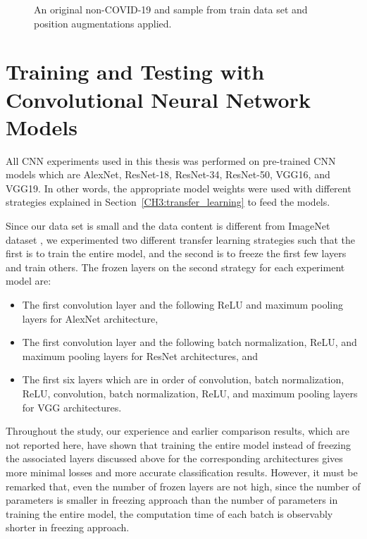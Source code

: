 \begin{figure}[h]
	\caption{An original non-COVID-19 and sample from train data set and position augmentations applied.}
	\label{augmented_sample}
\end{figure}

\section{Training and Testing with Convolutional Neural Network Models}\label{sec:CH5_cnn_experiments}

All CNN experiments used in this thesis was performed on pre-trained CNN models which are AlexNet, ResNet-18, ResNet-34, ResNet-50, VGG16, and VGG19. In other words, the appropriate model weights were used with different strategies explained in Section~\ref{CH3:transfer_learning} to feed the models.

Since our data set is small and the data content is different from ImageNet dataset \cite{imagenet}, we experimented two different transfer learning strategies such that the first is to train the entire model, and the second is to freeze the first few layers and train others. The frozen layers on the second strategy for each experiment model are:

\begin{itemize}
    \item The first convolution layer and the following ReLU and maximum pooling layers for AlexNet architecture,
    \item The first convolution layer and the following batch normalization, ReLU, and maximum pooling layers for ResNet architectures, and
    \item The first six layers which are in order of convolution, batch normalization, ReLU, convolution, batch normalization, ReLU, and maximum pooling layers for VGG architectures.
\end{itemize}

Throughout the study, our experience and earlier comparison results, which are not reported here, have shown that training the entire model instead of freezing the associated layers discussed above for the corresponding architectures gives more minimal losses and more accurate classification results. However, it must be remarked that, even the number of frozen layers are not high, since the number of parameters is smaller in freezing approach than the number of parameters in training the entire model, the computation time of each batch is observably shorter in freezing approach.


